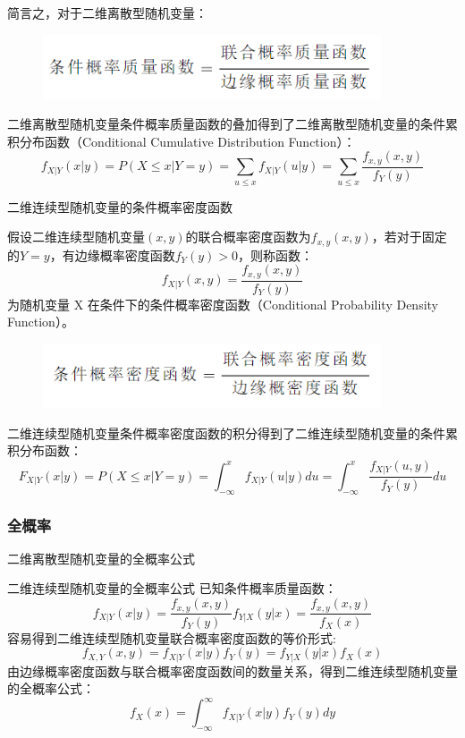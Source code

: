 \documentclass[12pt]{ctexart}
\begin{document}
简言之，对于二维离散型随机变量：
\begin{figure}[h]
    \centering
    \includegraphics[width = 10cm]{image/2.png}
\end{figure}
二维离散型随机变量条件概率质量函数的叠加得到了二维离散型随机变量的条件累积分布函数（Conditional Cumulative Distribution Function）：
\begin{equation}
    f_{X|Y}(x|y)=P(X\leq x | Y=y)=\sum_{u\leq x}f_{X|Y}(u|y)=\sum_{u\leq x}\frac{f_{x,y}(x,y)}{f_Y(y)}
\end{equation}

\textcolor{myblue}{二维连续型随机变量的条件概率密度函数}

假设二维连续型随机变量$(x,y)$的联合概率密度函数为$f_{x,y}(x,y)$，若对于固定的$Y=y$，有边缘概率密度函数$f_Y(y)>0$，则称函数：
\begin{equation}
    f_{X|Y}(x,y)=\frac{f_{x,y}(x,y)}{f_Y(y)}
\end{equation}
为随机变量 X 在条件下的条件概率密度函数（Conditional Probability Density Function）。
\begin{figure}[h]
    \centering
    \includegraphics[width = 10cm]{image/3.png}
\end{figure}
二维连续型随机变量条件概率密度函数的积分得到了二维连续型随机变量的条件累积分布函数：
\begin{equation}
    F_{X|Y}(x|y) = P(X\leq x| Y = y)=\int_{-\infty}^{x}f_{X|Y}(u|y)du=\int_{-\infty}^{x}\frac{f_{X|Y}(u,y)}{f_Y(y)}du
\end{equation}



\subsubsection{全概率}
\textcolor{myblue}{二维离散型随机变量的全概率公式}


\textcolor{myblue}{二维连续型随机变量的全概率公式}
已知条件概率质量函数：
\begin{equation}
    f_{X|Y}(x|y)=\frac{f_{x,y}(x,y)}{f_Y(y)}
    f_{Y|X}(y|x)=\frac{f_{x,y}(x,y)}{f_X(x)}
\end{equation}
容易得到二维连续型随机变量联合概率密度函数的等价形式:
\begin{equation}
    f_{X,Y}(x,y) = f_{X|Y}(x|y)f_Y(y)=f_{Y|X}(y|x)f_X(x)
\end{equation}
由边缘概率密度函数与联合概率密度函数间的数量关系，得到二维连续型随机变量的全概率公式：
\begin{equation}
    f_X(x)=\int_{-\infty}^{\infty}f_{X|Y}(x|y)f_Y(y)dy
\end{equation}
\end{document}
